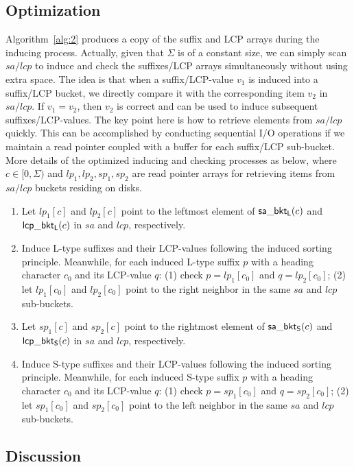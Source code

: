\documentclass[10pt,journal,compsoc]{IEEEtran}
\begin{document}
\subsection{Optimization} \label{sec:method2:optimization}

Algorithm~\ref{alg:2} produces a copy of the suffix and LCP arrays during the inducing process. Actually, given that $\Sigma$ is of a constant size, we can simply scan $sa/lcp$ to induce and check the suffixes/LCP arrays simultaneously without using extra space. The idea is that when a suffix/LCP-value $v_1$ is induced into a suffix/LCP bucket, we directly compare it with the corresponding item $v_2$ in $sa/lcp$. If $v_1 = v_2$, then $v_2$ is correct and can be used to induce subsequent suffixes/LCP-values. The key point here is how to retrieve elements from $sa/lcp$ quickly. This can be accomplished by conducting sequential I/O operations if we maintain a read pointer coupled with a buffer for each suffix/LCP sub-bucket. More details of the optimized inducing and checking processes as below, where $c \in [0, \Sigma)$ and $lp_1, lp_2, sp_1, sp_2$ are read pointer arrays for retrieving items from $sa/lcp$ buckets residing on disks.

\begin{enumerate}
	\item [S1] 
	Let $lp_1[c]$ and $lp_2[c]$ point to the leftmost element of ${\sf sa\_bkt_L}(c)$ and ${\sf lcp\_bkt_L}(c)$ in $sa$ and $lcp$, respectively. 
	\item [S2]
	Induce L-type suffixes and their LCP-values following the induced sorting principle. Meanwhile, for each induced L-type suffix $p$ with a heading character $c_0$ and its LCP-value $q$: (1) check $p = lp_1[c_0]$ and $q = lp_2[c_0]$; (2) let $lp_1[c_0]$ and $lp_2[c_0]$ point to the right neighbor in the same $sa$ and $lcp$ sub-buckets.
	\item [S3] 
	Let $sp_1[c]$ and $sp_2[c]$ point to the rightmost element of ${\sf sa\_bkt_S}(c)$ and ${\sf lcp\_bkt_S}(c)$ in $sa$ and $lcp$, respectively. 
	\item [S4]
	Induce S-type suffixes and their LCP-values following the induced sorting principle. Meanwhile, for each induced S-type suffix $p$ with a heading character $c_0$ and its LCP-value $q$: (1) check $p = sp_1[c_0]$ and $q = sp_2[c_0]$; (2) let $sp_1[c_0]$ and $sp_2[c_0]$ point to the left neighbor in the same $sa$ and $lcp$ sub-buckets.
\end{enumerate}


\subsection{Discussion} \label{sec:method2:discussion}
\end{document}
